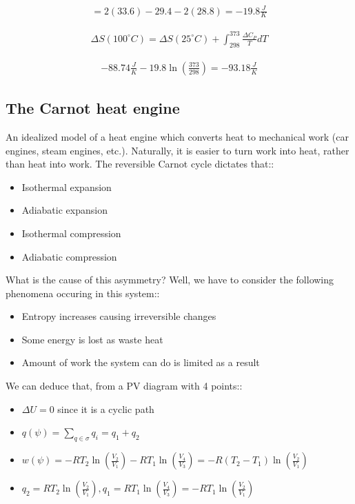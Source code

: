 \documentclass[12pt]{book}
\begin{document}
\begin{align*}
    =2(33.6)-29.4-2(28.8)=-19.8\frac{J}{K}
\end{align*}

\begin{align*}
    \Delta S(100^{\circ}C)=\Delta S(25^{\circ}C)+\int_{298}^{373}\frac{\Delta C_P}{T} dT
\end{align*}

\begin{align*}
    -88.74\frac{J}{K}-19.8\ln\left(\frac{373}{298}\right)=-93.18\frac{J}{K}
\end{align*}

\subsection*{The Carnot heat engine}

An idealized model of a heat engine which converts heat to mechanical work (car engines, steam engines, etc.). Naturally, it is easier to turn work into heat, rather than heat into work. The reversible Carnot cycle dictates that::

\begin{itemize}
    \item Isothermal expansion
    \item Adiabatic expansion
    \item Isothermal compression
    \item Adiabatic compression
\end{itemize}

What is the cause of this asymmetry? Well, we have to consider the following phenomena occuring in this system::

\begin{itemize}
    \item Entropy increases causing irreversible changes
    \item Some energy is lost as waste heat
    \item Amount of work the system can do is limited as a result
\end{itemize}

We can deduce that, from a PV diagram with 4 points::

\begin{itemize}
    \item $\Delta U=0$ since it is a cyclic path
    \item $q(\psi)=\sum_{q\in \sigma}q_i=q_1+q_2$
    \item $w(\psi)=-RT_2\ln\left(\frac{V_2}{V_1}\right)-RT_1\ln\left(\frac{V_4}{V_3}\right)=-R(T_2-T_1)\ln\left(\frac{V_2}{V_1}\right)$
    \item $q_2=RT_2\ln\left(\frac{V_2}{V_1}\right), q_1=RT_1\ln\left(\frac{V_4}{V_3}\right)=-RT_1\ln\left(\frac{V_2}{V_1}\right)$
\end{itemize}
\end{document}
